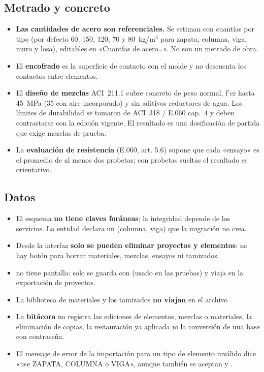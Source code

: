 \subsection{Metrado y concreto}

\begin{itemize}
	\item \textbf{Las cantidades de acero son referenciales.} Se estiman con cuantías por tipo (por defecto 60, 150,
	      120, 70 y 80~kg/m$^3$ para zapata, columna, viga, muro y losa), editables en «Cuantías de acero\ldots». No son un
	      metrado de obra.
	\item El \textbf{encofrado} es la superficie de contacto con el molde y no descuenta los contactos entre elementos.
	\item El \textbf{diseño de mezclas} ACI~211.1 cubre concreto de peso normal, f'cr hasta 45~MPa (35 con aire
	      incorporado) y sin aditivos reductores de agua. Los límites de durabilidad se tomaron de ACI~318 / E.060 cap.~4
	      y deben contrastarse con la edición vigente. El resultado es una dosificación de partida que exige mezclas de
	      prueba.
	\item La \textbf{evaluación de resistencia} (E.060, art. 5.6) supone que cada «ensayo» es el promedio de al menos
	      dos probetas; con probetas sueltas el resultado es orientativo.
\end{itemize}

\subsection{Datos}

\begin{itemize}
	\item El esquema \textbf{no tiene claves foráneas}; la integridad depende de los servicios. La entidad
	       declara un  (columna, viga) que la migración no crea.
	\item Desde la interfaz \textbf{solo se pueden eliminar proyectos y elementos}: no hay botón para borrar materiales,
	      mezclas, ensayos ni tamizados.
	\item {} no tiene pantalla: solo se guarda con  (usado en las
	      pruebas) y viaja en la exportación de proyectos.
	\item La biblioteca de materiales y los tamizados \textbf{no viajan} en el archivo .
	\item La \textbf{bitácora} no registra las ediciones de elementos, mezclas o materiales, la eliminación de copias, la
	      restauración ya aplicada ni la conversión de una base con contraseña.
	\item El mensaje de error de la importación para un tipo de elemento inválido dice «use ZAPATA, COLUMNA o VIGA»,
	      aunque también se aceptan  y .
\end{itemize}

